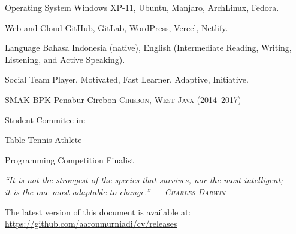 \documentclass[11pt,a4paper]{article} %
\begin{document}
\headedsection
{Operating System}{} {
    \headedsubsection %
    {Windows XP-11, Ubuntu, Manjaro, ArchLinux, Fedora.}{}{}
}

\headedsection
{Web and Cloud}{} {
    \headedsubsection %
    {GitHub, GitLab, WordPress, Vercel, Netlify.}{}{}
}

\headedsection
{Language}{} {
    \headedsubsection %
    {Bahasa Indonesia (native), English (Intermediate Reading, Writing, Listening, and Active Speaking).}{}{}
}

\headedsection
{Social}{} {
    \headedsubsection %
    {Team Player, Motivated, Fast Learner, Adaptive, Initiative.}{}{}
}



\headedsection %
{\href{}{SMAK BPK Penabur Cirebon}}
{\dotfill\textsc{Cirebon, West Java (2014--2017)}} {

    \headedsubsection %
    { Student Commitee in: }
    {}
    {}

    \headedsubsection %
    { Table Tennis Athlete}
    {~}
    {}

    \headedsubsection %
    { Programming Competition Finalist}
    {~}
    {}
}

\vfill

\begin{flushright}
    \textit{
        ``It is not the strongest of the species that survives, nor the most intelligent;\\it is the one most adaptable to change.'' — \textsc{Charles Darwin}}
\end{flushright}

\vfill

\vfill

\begin{center}
    \smaller
    The latest version of this document is available at:\\\href{https://github.com/aaronmurniadi/cv/releases}{https://github.com/aaronmurniadi/cv/releases}
\end{center}
\end{document}
